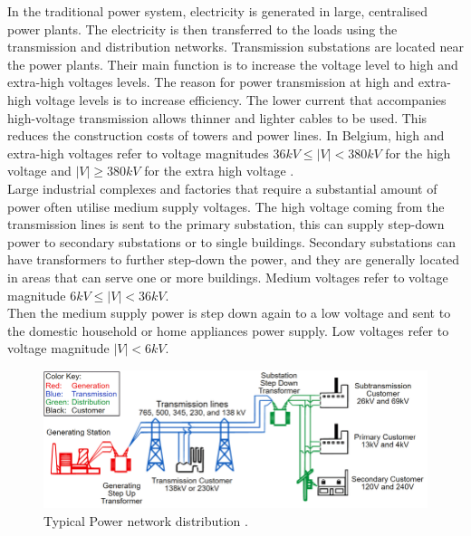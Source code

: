 In the traditional power system, electricity is generated in large, centralised power plants. The electricity is then transferred to the loads using the transmission and distribution networks. Transmission substations are located near the power plants. Their main function is to increase the voltage level to high and extra-high voltages levels. The reason for power transmission at high and extra-high voltage levels is to increase efficiency. The lower current that accompanies high-voltage transmission allows thinner and lighter cables to be used. This reduces the construction costs of towers and power lines. In Belgium, high and extra-high voltages refer to voltage magnitudes $36 kV \leq |V| < 380 kV$ for the high voltage and $|V| \geq 380 kV$ for the extra high voltage \cite{elia}. \\
Large industrial complexes and factories that require a substantial amount of power often utilise medium supply voltages. The high voltage coming from the transmission lines is sent to the primary substation, this can supply step-down power to secondary substations or to single buildings. Secondary substations can have transformers to further step-down the power, and they are generally located in areas that can serve one or more buildings. Medium voltages refer to voltage magnitude $6 kV \leq |V| < 36 kV$. \\
Then the medium supply power is step down again to a low voltage and sent to the domestic household or home appliances power supply. Low voltages refer to voltage magnitude $|V| < 6 kV$. \\
\begin{figure}[H]
\centering
    \includegraphics[width=.9\linewidth]{images/Background/DN/Basic-Structure-of-the-Electric-Power-System-5.png }
\caption[Power network distribution]{Typical Power network distribution \cite{USblackout}.}
\end{figure}


